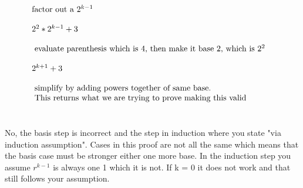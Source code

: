 \documentclass[letterpaper]{article}
\begin{document}
\begin{displaymath}
\begin{array}{llll}
            & $factor out a $ 2^{k-1} &&\\
            \\
            & 2^2 * 2^{k-1} + 3 &&\\
            \\
            & $ evaluate parenthesis which is 4, then make it base 2, which is $ 2^2 &&\\
            \\ 
            & 2^{k+1} + 3 &&\\
            \\
            & $ simplify by adding powers together of same base.  $&&\\
            & $ This returns what we are trying to prove making this valid $ &&\\
            \end{array}
        \end{displaymath}
    \section{}
    	No, the basis step is incorrect and the step in induction where you state
        "via induction assumption".  Cases in this proof are not all the same which 
        means that the basis case must be stronger either one more base.  In the
        induction step you assume $r^{k-1}$ is always one 1 which it is not. 
        If k = 0 it does not work and that still follows your assumption.
\end{document}
